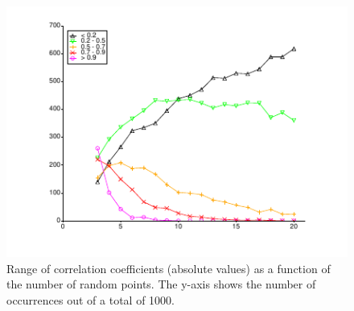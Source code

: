 \documentclass[onecolumn]{article}
\begin{document}
\begin{figure}
\center
\caption{Range of correlation coefficients (absolute values) as a function of the number of random points.
The y-axis shows the number of occurrences out of a total of 1000.}
\label{effectsize}
\includegraphics{effect_set_size.pdf}
\end{figure}
\end{document}
